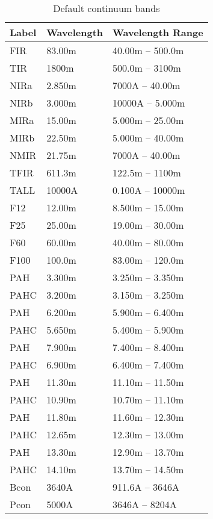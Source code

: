 \begin{table}
\centering
\caption{\label{tab:continuum_bands}Default continuum bands}
\begin{tabular}{lll}
\hline
Label& Wavelength&Wavelength Range\\
\hline
FIR  & 83.00m & 40.00m -- 500.0m\\
TIR  &  1800m & 500.0m --  3100m\\
NIRa & 2.850m &  7000A -- 40.00m\\
NIRb & 3.000m & 10000A -- 5.000m\\
MIRa & 15.00m & 5.000m -- 25.00m\\
MIRb & 22.50m & 5.000m -- 40.00m\\
NMIR & 21.75m &  7000A -- 40.00m\\
TFIR & 611.3m & 122.5m --  1100m\\
TALL & 10000A & 0.100A -- 10000m\\
F12  & 12.00m & 8.500m -- 15.00m\\
F25  & 25.00m & 19.00m -- 30.00m\\
F60  & 60.00m & 40.00m -- 80.00m\\
F100 & 100.0m & 83.00m -- 120.0m\\
PAH  & 3.300m & 3.250m -- 3.350m\\
PAHC & 3.200m & 3.150m -- 3.250m\\
PAH  & 6.200m & 5.900m -- 6.400m\\
PAHC & 5.650m & 5.400m -- 5.900m\\
PAH  & 7.900m & 7.400m -- 8.400m\\
PAHC & 6.900m & 6.400m -- 7.400m\\
PAH  & 11.30m & 11.10m -- 11.50m\\
PAHC & 10.90m & 10.70m -- 11.10m\\
PAH  & 11.80m & 11.60m -- 12.30m\\
PAHC & 12.65m & 12.30m -- 13.00m\\
PAH  & 13.30m & 12.90m -- 13.70m\\
PAHC & 14.10m & 13.70m -- 14.50m\\
Bcon &  3640A & 911.6A --  3646A\\
Pcon &  5000A &  3646A --  8204A\\
\hline
\end{tabular}
\end{table}

